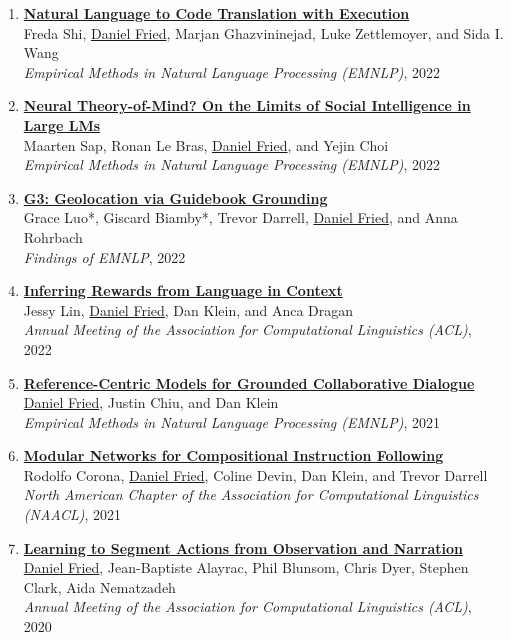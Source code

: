 \begin{enumerate}[leftmargin=-1mm,partopsep=0pt]
\item \href{https://arxiv.org/abs/2204.11454}{\textbf{Natural Language to Code Translation with Execution}} \\
  Freda Shi, \underline{Daniel Fried}, Marjan Ghazvininejad, Luke Zettlemoyer, and Sida I. Wang\\
  \emph{Empirical Methods in Natural Language Processing (EMNLP)}, 2022

\item \href{https://arxiv.org/abs/2210.13312}{\textbf{Neural Theory-of-Mind? On the Limits of Social Intelligence in Large LMs}} \\
  Maarten Sap, Ronan Le Bras, \underline{Daniel Fried}, and Yejin Choi \\
  \emph{Empirical Methods in Natural Language Processing (EMNLP)}, 2022

\item \href{https://arxiv.org/abs/2211.15521}{\textbf{G3: Geolocation via Guidebook Grounding}} \\
  Grace Luo*, Giscard Biamby*, Trevor Darrell, \underline{Daniel Fried}, and Anna Rohrbach\\
  \emph{Findings of EMNLP}, 2022

\item \href{https://arxiv.org/abs/2204.02515}{\textbf{Inferring Rewards from Language in Context}} \\
  Jessy Lin, \underline{Daniel Fried}, Dan Klein, and Anca Dragan\\
  \emph{Annual Meeting of the Association for Computational Linguistics (ACL)}, 2022

\item \href{https://arxiv.org/abs/2109.05042}{\textbf{Reference-Centric Models for Grounded Collaborative Dialogue}} \\
  \underline{Daniel Fried}, Justin Chiu, and Dan Klein\\
  \emph{Empirical Methods in Natural Language Processing (EMNLP)}, 2021

\item \href{https://arxiv.org/abs/2010.12764}{\textbf{Modular Networks for Compositional Instruction Following}} \\
  Rodolfo Corona, \underline{Daniel Fried}, Coline Devin, Dan Klein, and Trevor Darrell\\
  \emph{North American Chapter of the Association for Computational Linguistics (NAACL)}, 2021

\item \href{https://arxiv.org/abs/2005.03684}{\textbf{Learning to Segment Actions from Observation and Narration}} \\
  \underline{Daniel Fried}, Jean-Baptiste Alayrac, Phil Blunsom, Chris Dyer, Stephen Clark, Aida Nematzadeh\\
  \emph{Annual Meeting of the Association for Computational Linguistics (ACL)}, 2020


\end{enumerate}
